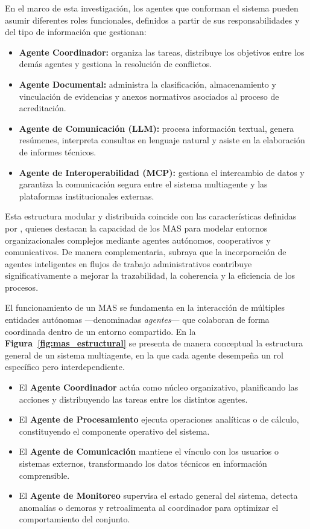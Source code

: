 \documentclass[12pt]{article}
\let\cite\citep
\begin{document}
En el marco de esta investigación, los agentes que conforman el sistema pueden asumir diferentes roles funcionales, definidos a partir de sus responsabilidades y del tipo de información que gestionan:
\begin{itemize}
    \item \textbf{Agente Coordinador:} organiza las tareas, distribuye los objetivos entre los demás agentes y gestiona la resolución de conflictos.
    \item \textbf{Agente Documental:} administra la clasificación, almacenamiento y vinculación de evidencias y anexos normativos asociados al proceso de acreditación.
    \item \textbf{Agente de Comunicación (LLM):} procesa información textual, genera resúmenes, interpreta consultas en lenguaje natural y asiste en la elaboración de informes técnicos.
    \item \textbf{Agente de Interoperabilidad (MCP):} gestiona el intercambio de datos y garantiza la comunicación segura entre el sistema multiagente y las plataformas institucionales externas.
\end{itemize}

Esta estructura modular y distribuida coincide con las características definidas por \cite{perez2022breve}, quienes destacan la capacidad de los MAS para modelar entornos organizacionales complejos mediante agentes autónomos, cooperativos y comunicativos. De manera complementaria, \cite{farsane2025automatizacion} subraya que la incorporación de agentes inteligentes en flujos de trabajo administrativos contribuye significativamente a mejorar la trazabilidad, la coherencia y la eficiencia de los procesos.

El funcionamiento de un MAS se fundamenta en la interacción de múltiples entidades autónomas —denominadas \textit{agentes}— que colaboran de forma coordinada dentro de un entorno compartido. En la \textbf{Figura~\ref{fig:mas_estructural}} se presenta de manera conceptual la estructura general de un sistema multiagente, en la que cada agente desempeña un rol específico pero interdependiente.

\begin{itemize}
    \item El \textbf{Agente Coordinador} actúa como núcleo organizativo, planificando las acciones y distribuyendo las tareas entre los distintos agentes.
    \item El \textbf{Agente de Procesamiento} ejecuta operaciones analíticas o de cálculo, constituyendo el componente operativo del sistema.
    \item El \textbf{Agente de Comunicación} mantiene el vínculo con los usuarios o sistemas externos, transformando los datos técnicos en información comprensible.
    \item El \textbf{Agente de Monitoreo} supervisa el estado general del sistema, detecta anomalías o demoras y retroalimenta al coordinador para optimizar el comportamiento del conjunto.
\end{itemize}
\end{document}
